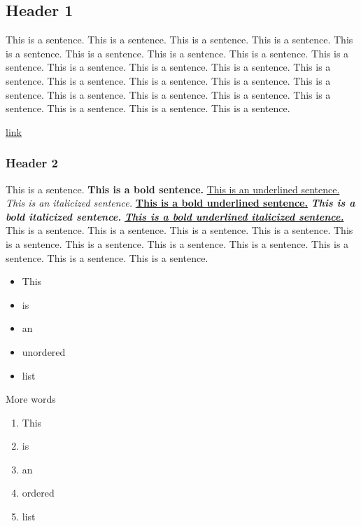 \label{019e05ce-de7d-7c46-9eb4-6817bce838e9}

\subsection{Header 1}

This is a sentence. This is a sentence. This is a sentence. This is a sentence. This is a sentence. This is a sentence. This is a sentence. This is a sentence. This is a sentence. This is a sentence. This is a sentence. This is a sentence. This is a sentence. This is a sentence. This is a sentence. This is a sentence. This is a sentence. This is a sentence. This is a sentence. This is a sentence. This is a sentence. This is a sentence. This is a sentence. This is a sentence.

\underline{\hyperref[019e05ce-de7d-7909-9444-73a79c8228ce]{link}}

\subsubsection{Header 2}

This is a sentence. \textbf{This is a bold sentence.} \underline{This is an underlined sentence.} \textit{This is an italicized sentence.} \underline{\textbf{This is a bold underlined sentence.}}\textbf{ }\textit{\textbf{This is a bold italicized sentence.}} \underline{\textit{\textbf{This is a bold underlined italicized sentence.}}} This is a sentence. This is a sentence. This is a sentence. This is a sentence. This is a sentence. This is a sentence. This is a sentence. This is a sentence. This is a sentence. This is a sentence. This is a sentence.

\begin{itemize}
  \item This
  \item is
  \item an
  \item unordered
  \item list
\end{itemize}

More words

\begin{enumerate}
  \item This
  \item is
  \item an
  \item ordered
  \item list
\end{enumerate}


